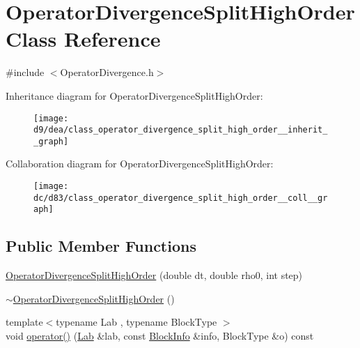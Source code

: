 \hypertarget{class_operator_divergence_split_high_order}{}\section{Operator\+Divergence\+Split\+High\+Order Class Reference}
\label{class_operator_divergence_split_high_order}


{\ttfamily \#include $<$Operator\+Divergence.\+h$>$}



Inheritance diagram for Operator\+Divergence\+Split\+High\+Order\+:\nopagebreak
\begin{figure}[H]
\begin{center}
\leavevmode
\texttt{[image: d9/dea/class\_operator\_divergence\_split\_high\_order\_\_inherit\_\_graph]}
\end{center}
\end{figure}


Collaboration diagram for Operator\+Divergence\+Split\+High\+Order\+:\nopagebreak
\begin{figure}[H]
\begin{center}
\leavevmode
\texttt{[image: dc/d83/class\_operator\_divergence\_split\_high\_order\_\_coll\_\_graph]}
\end{center}
\end{figure}
\subsection*{Public Member Functions}
\begin{DoxyCompactItemize}
\item 
\hyperlink{class_operator_divergence_split_high_order_a707ec7a6c74a6d965fdbd026e5a3c7c9}{Operator\+Divergence\+Split\+High\+Order} (double dt, double rho0, int step)
\item 
\hyperlink{class_operator_divergence_split_high_order_a7eaeb8f57838ea962dcf91b60094e5ae}{$\sim$\+Operator\+Divergence\+Split\+High\+Order} ()
\item 
{\footnotesize template$<$typename Lab , typename Block\+Type $>$ }\\void \hyperlink{class_operator_divergence_split_high_order_ac60d292305a45684efcf88b0e9fc1618}{operator()} (\hyperlink{_definitions_8h_ae720d9054713370bbf4c86860e4dde70}{Lab} \&lab, const \hyperlink{struct_block_info}{Block\+Info} \&info, Block\+Type \&o) const 
\end{DoxyCompactItemize}
